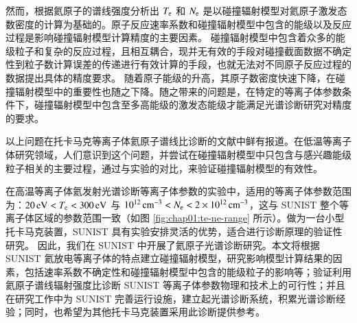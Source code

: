 然而，根据氦原子的谱线强度分析出 $T_{\rm e}$ 和 $N_{\rm e}$ 是以碰撞辐射模型对氦原子激发态数密度的计算为基础的。原子反应速率系数和碰撞辐射模型中包含的能级以及反应过程是影响碰撞辐射模型计算精度的主要因素。
碰撞辐射模型中包含着众多的能级粒子和复杂的反应过程，且相互耦合，现并无有效的手段对碰撞截面数据不确定性到粒子数计算误差的传递进行有效计算的手段，也就无法对不同原子反应过程的数据提出具体的精度要求。
随着原子能级的升高，其原子数密度快速下降，在碰撞辐射模型中的重要性也随之下降。随之带来的问题是，在特定的等离子体参数条件下，碰撞辐射模型中包含至多高能级的激发态能级才能满足光谱诊断研究对精度的要求。

以上问题在托卡马克等离子体氦原子谱线比诊断的文献中鲜有报道。在低温等离子体研究领域，人们意识到这个问题\cite{ZhuXM2009:Thesis}，并尝试在碰撞辐射模型中只包含与感兴趣能级粒子相关的主要过程，通过与实验的对比，来验证碰撞辐射模型的有效性。

在高温等离子体氦发射光谱诊断等离子体参数的实验中，适用的等离子体参数范围\cite{Schmitz2008} 为：$20\,{\rm eV}<T_{\rm e}<300\,{\rm eV}$ 与 $10^{12}\,{\rm cm}^{-3}<N_{\rm e}<2\times10^{12}\,{\rm cm}^{-3}$，这与 SUNIST 整个等离子体区域的参数范围一致（如图 \ref{fig:chap01:te-ne-range} 所示）。做为一台小型托卡马克装置，SUNIST 具有实验安排灵活的优势，适合进行诊断原理的验证性研究。
因此，我们在 SUNIST 中开展了氦原子光谱诊断研究。本文将根据 SUNIST 氦放电等离子体的特点建立碰撞辐射模型，研究影响模型计算结果的因素，包括速率系数不确定性和碰撞辐射模型中包含的能级粒子的影响等；验证利用氦原子谱线辐射强度比诊断 SUNIST 等离子体参数物理和技术上的可行性；并且在研究工作中为 SUNIST 完善运行设施，建立起光谱诊断系统，积累光谱诊断经验；同时，也希望为其他托卡马克装置采用此诊断提供参考。%

